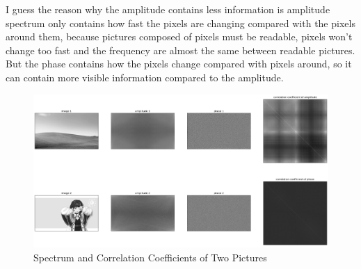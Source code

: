 \documentclass{article}
\begin{document}
I guess the reason why the amplitude contains less information is amplitude spectrum only contains how fast the pixels are changing compared with the pixels around them, because pictures composed of pixels must be readable, pixels won't change too fast and the frequency are almost the same between readable pictures. But the phase contains how the pixels change compared with pixels around, so it can contain more visible information compared to the amplitude.

\begin{figure}[!h]
	\centering
	\includegraphics[width=6 in]{../pic/imgSpec.png}
	\caption{Spectrum and Correlation Coefficients of Two Pictures}
	\label{fig:imgSpec}
\end{figure}




\end{document}
